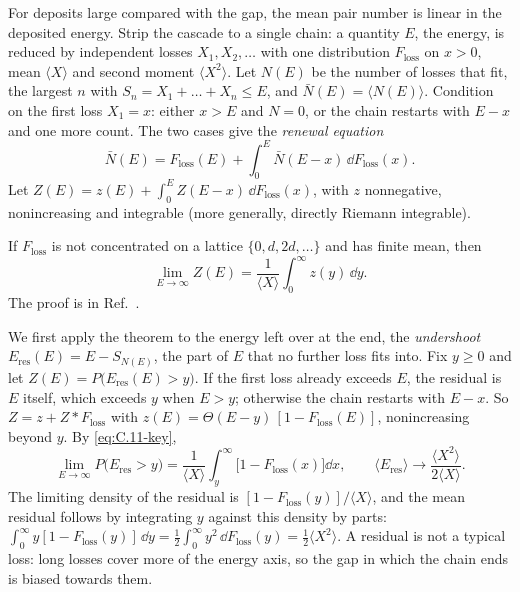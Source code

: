 For deposits large compared with the gap, the mean pair number is linear in the deposited energy. Strip the cascade to a single chain: a quantity $E$, the energy, is reduced by independent losses $X_1, X_2, \dots$ with one distribution $F_{\mathrm{loss}}$ on $x > 0$, mean $\langle X\rangle$ and second moment $\langle X^2\rangle$. Let $N(E)$ be the number of losses that fit, the largest $n$ with $S_n = X_1 + \dots + X_n \le E$, and $\bar N(E) = \langle N(E)\rangle$. Condition on the first loss $X_1 = x$: either $x > E$ and $N = 0$, or the chain restarts with $E - x$ and one more count. The two cases give the \emph{renewal equation}
\begin{equation}
  \bar N(E) = F_{\mathrm{loss}}(E) + \int_0^E\bar N(E - x)\,\dd F_{\mathrm{loss}}(x) .
  \label{eq:C.11-renewal}
\end{equation}
Let $Z(E) = z(E) + \int_0^E Z(E - x)\,\dd F_{\mathrm{loss}}(x)$, with $z$ nonnegative, nonincreasing and integrable (more generally, directly Riemann integrable).
\begin{keyresult}
If $F_{\mathrm{loss}}$ is not concentrated on a lattice $\{0, d, 2d, \dots\}$ and has finite mean, then
\begin{equation}
  \lim_{E\to\infty} Z(E) = \frac{1}{\langle X\rangle}\int_0^\infty z(y)\,\dd y .
  \label{eq:C.11-key}
\end{equation}
The proof is in Ref.~\cite[Chap.~XI.1]{feller1971introduction}.
\end{keyresult}

We first apply the theorem to the energy left over at the end, the \emph{undershoot} $E_{\mathrm{res}}(E) = E - S_{N(E)}$, the part of $E$ that no further loss fits into. Fix $y \ge 0$ and let $Z(E) = P\bigl(E_{\mathrm{res}}(E) > y\bigr)$. If the first loss already exceeds $E$, the residual is $E$ itself, which exceeds $y$ when $E > y$; otherwise the chain restarts with $E - x$. So $Z = z + Z * F_{\mathrm{loss}}$ with $z(E) = \Theta(E - y)\,[1 - F_{\mathrm{loss}}(E)]$, nonincreasing beyond $y$. By \cref{eq:C.11-key},
\begin{equation}
  \lim_{E\to\infty}P\bigl(E_{\mathrm{res}} > y\bigr) = \frac{1}{\langle X\rangle}\int_y^\infty\bigl[1 - F_{\mathrm{loss}}(x)\bigr]\dd x ,
  \qquad
  \langle E_{\mathrm{res}}\rangle \to \frac{\langle X^2\rangle}{2\langle X\rangle} .
  \label{eq:C.11-undershoot}
\end{equation}
The limiting density of the residual is $[1 - F_{\mathrm{loss}}(y)]/\langle X\rangle$, and the mean residual follows by integrating $y$ against this density by parts: $\int_0^\infty y[1 - F_{\mathrm{loss}}(y)]\,\dd y = \tfrac12\int_0^\infty y^2\,\dd F_{\mathrm{loss}}(y) = \tfrac12\langle X^2\rangle$. A residual is not a typical loss: long losses cover more of the energy axis, so the gap in which the chain ends is biased towards them.

